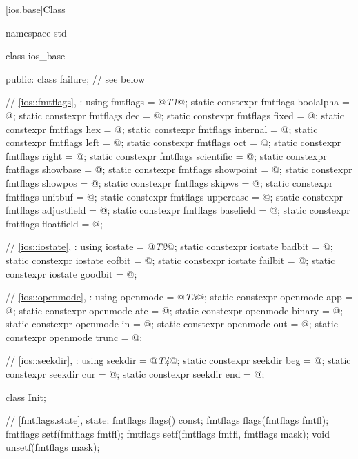 [ios.base]{Class }
%
\begin{codeblock}
namespace std {
  class ios_base {
  public:
    class failure; // see below

    // \ref{ios::fmtflags}, :
    using fmtflags = @\textit{T1}@;
    static constexpr fmtflags boolalpha = @\unspec@;
    static constexpr fmtflags dec = @\unspec@;
    static constexpr fmtflags fixed = @\unspec@;
    static constexpr fmtflags hex = @\unspec@;
    static constexpr fmtflags internal = @\unspec@;
    static constexpr fmtflags left = @\unspec@;
    static constexpr fmtflags oct = @\unspec@;
    static constexpr fmtflags right = @\unspec@;
    static constexpr fmtflags scientific = @\unspec@;
    static constexpr fmtflags showbase = @\unspec@;
    static constexpr fmtflags showpoint = @\unspec@;
    static constexpr fmtflags showpos = @\unspec@;
    static constexpr fmtflags skipws = @\unspec@;
    static constexpr fmtflags unitbuf = @\unspec@;
    static constexpr fmtflags uppercase = @\unspec@;
    static constexpr fmtflags adjustfield = @\seebelow@;
    static constexpr fmtflags basefield = @\seebelow@;
    static constexpr fmtflags floatfield = @\seebelow@;

    // \ref{ios::iostate}, :
    using iostate = @\textit{T2}@;
    static constexpr iostate badbit = @\unspec@;
    static constexpr iostate eofbit = @\unspec@;
    static constexpr iostate failbit = @\unspec@;
    static constexpr iostate goodbit = @\seebelow@;

    // \ref{ios::openmode}, :
    using openmode = @\textit{T3}@;
    static constexpr openmode app = @\unspec@;
    static constexpr openmode ate = @\unspec@;
    static constexpr openmode binary = @\unspec@;
    static constexpr openmode in = @\unspec@;
    static constexpr openmode out = @\unspec@;
    static constexpr openmode trunc = @\unspec@;

    // \ref{ios::seekdir}, :
    using seekdir = @\textit{T4}@;
    static constexpr seekdir beg = @\unspec@;
    static constexpr seekdir cur = @\unspec@;
    static constexpr seekdir end = @\unspec@;

    class Init;

    // \ref{fmtflags.state},  state:
    fmtflags flags() const;
    fmtflags flags(fmtflags fmtfl);
    fmtflags setf(fmtflags fmtfl);
    fmtflags setf(fmtflags fmtfl, fmtflags mask);
    void unsetf(fmtflags mask);

}}
\end{codeblock}
